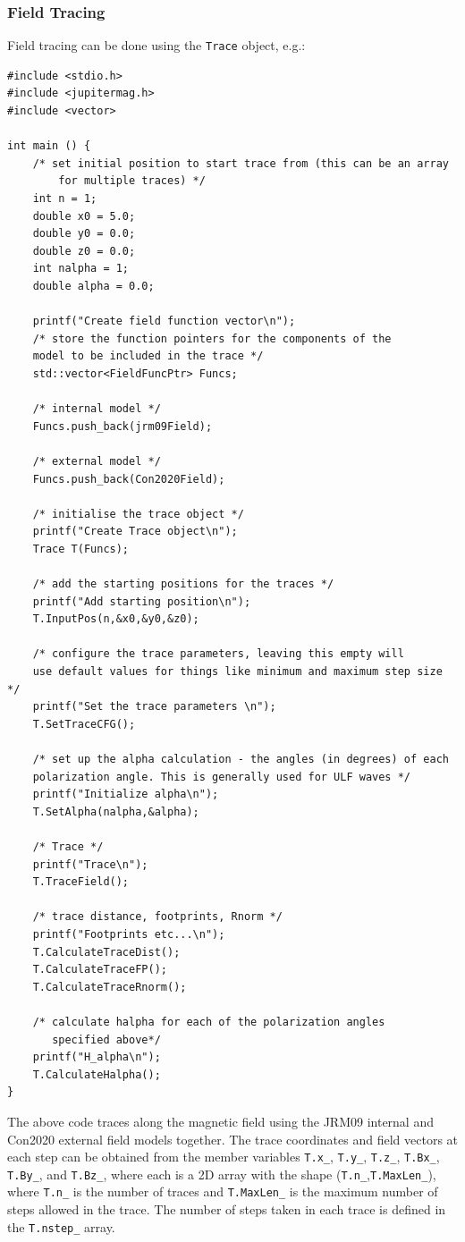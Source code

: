	\subsubsection{Field Tracing}
	
		Field tracing can be done using the \texttt{Trace} object, e.g.:
	
		\begin{verbatim}
#include <stdio.h>
#include <jupitermag.h>
#include <vector>
	
int main () {
	/* set initial position to start trace from (this can be an array
		for multiple traces) */
	int n = 1;
	double x0 = 5.0;
	double y0 = 0.0;
	double z0 = 0.0;
	int nalpha = 1;
	double alpha = 0.0;
	
	printf("Create field function vector\n");
	/* store the function pointers for the components of the
	model to be included in the trace */
	std::vector<FieldFuncPtr> Funcs;
	
	/* internal model */
	Funcs.push_back(jrm09Field);
	
	/* external model */
	Funcs.push_back(Con2020Field);
	
	/* initialise the trace object */
	printf("Create Trace object\n");
	Trace T(Funcs);
	
	/* add the starting positions for the traces */
	printf("Add starting position\n");
	T.InputPos(n,&x0,&y0,&z0);
	
	/* configure the trace parameters, leaving this empty will
	use default values for things like minimum and maximum step size */
	printf("Set the trace parameters \n");
	T.SetTraceCFG();
	
	/* set up the alpha calculation - the angles (in degrees) of each 
	polarization angle. This is generally used for ULF waves */
	printf("Initialize alpha\n");
	T.SetAlpha(nalpha,&alpha);    
	
	/* Trace */
	printf("Trace\n");
	T.TraceField();
	
	/* trace distance, footprints, Rnorm */
	printf("Footprints etc...\n");
	T.CalculateTraceDist();
	T.CalculateTraceFP();
	T.CalculateTraceRnorm();
	
	/* calculate halpha for each of the polarization angles 
	   specified above*/
	printf("H_alpha\n");
	T.CalculateHalpha();
}
		\end{verbatim}
		
		The above code traces along the magnetic field using the JRM09 internal and Con2020 external field models together. The trace coordinates and field vectors at each step can be obtained from the member variables \texttt{T.x\_}, \texttt{T.y\_}, \texttt{T.z\_}, \texttt{T.Bx\_}, \texttt{T.By\_}, and \texttt{T.Bz\_}, where each is a 2D array with the shape (\texttt{T.n\_},\texttt{T.MaxLen\_}), where \texttt{T.n\_} is the number of traces and \texttt{T.MaxLen\_} is the maximum number of steps allowed in the trace. The number of steps taken in each trace is defined in the \texttt{T.nstep\_} array.
		



